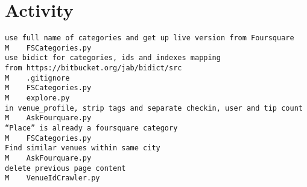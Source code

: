 \section*{Activity}
\begin{verbatim}
use full name of categories and get up live version from Foursquare
M    FSCategories.py
use bidict for categories, ids and indexes mapping
from https://bitbucket.org/jab/bidict/src
M    .gitignore
M    FSCategories.py
M    explore.py
in venue_profile, strip tags and separate checkin, user and tip count
M    AskFourquare.py
“Place” is already a foursquare category
M    FSCategories.py
Find similar venues within same city
M    AskFourquare.py
delete previous page content
M    VenueIdCrawler.py
\end{verbatim}

